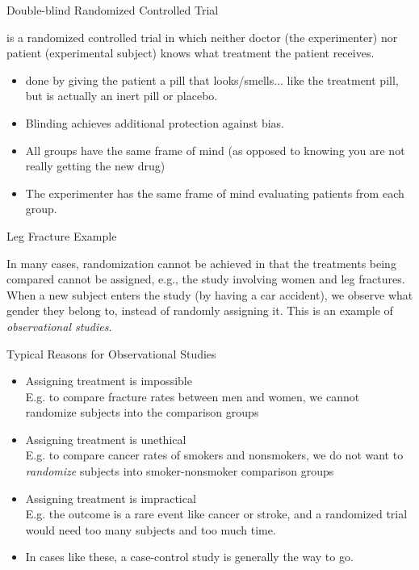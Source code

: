 \documentclass[14pt]{beamer}\usepackage[]{graphicx}\usepackage[]{color}
\begin{document}
\begin{frame}[fragile]{Double-blind Randomized Controlled Trial}

is a randomized controlled trial in which neither doctor (the  experimenter) nor patient (experimental subject) knows what treatment  the patient receives.

\begin{itemize}
\item<1-> done by giving the patient a pill that looks/smells... like the  treatment pill, but is actually an inert pill or placebo.
\item<2-> Blinding achieves additional protection against bias.
\item<3-> All groups have the same frame of mind (as opposed to knowing  you are not really getting the new drug)
\item<4-> The experimenter has the same frame of mind evaluating patients  from each group.
\end{itemize}
\end{frame}

\begin{frame}[fragile]{Leg Fracture Example}

In many cases, randomization cannot be achieved in that the  treatments being compared cannot be assigned, e.g., the study  involving women and leg fractures. When a new subject enters the  study (by having a car accident), we observe what gender they belong  to, instead of randomly assigning it. This is an example of  \textit{observational studies}.
\end{frame}

\begin{frame}[fragile]{Typical Reasons for Observational Studies}

{\footnotesize{
\begin{itemize}
\item<1-> Assigning treatment is impossible \\
E.g. to compare fracture rates between men and women, we  cannot randomize subjects into the comparison groups
\item<2-> Assigning treatment is unethical \\
E.g. to compare cancer rates of smokers and nonsmokers, we do  not want to \textit{randomize} subjects into smoker-nonsmoker comparison groups
\item<3-> Assigning treatment is impractical \\
E.g. the outcome is a rare event like cancer or stroke, and a  randomized trial would need too many subjects and too much  time.
\item<4-> In cases like these, a case-control study is generally the way to go.
\end{itemize}
}}
\end{frame}
\end{document}
